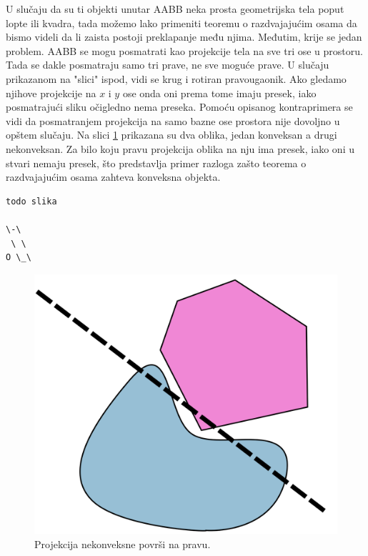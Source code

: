 \documentclass[12pt,oneside]{memoir}
\begin{document}
U slučaju da su ti objekti unutar AABB neka prosta geometrijska tela poput
lopte ili kvadra, tada možemo lako primeniti teoremu o razdvajajućim osama da bismo videli da li zaista 
postoji preklapanje među njima. Međutim, krije se jedan problem.
AABB se mogu posmatrati kao projekcije tela na sve tri ose u prostoru.
Tada se dakle posmatraju samo tri prave, ne sve moguće prave. 
U slučaju prikazanom na "slici" ispod, vidi se krug i rotiran pravougaonik. Ako gledamo njihove projekcije 
na $x$ i $y$ ose onda oni prema tome imaju presek, iako posmatrajući sliku očigledno nema preseka.
Pomoću opisanog kontraprimera se vidi da posmatranjem projekcija na samo bazne ose prostora nije dovoljno
u opštem slučaju. Na slici \ref{fig:counter} prikazana su dva oblika, jedan konveksan a drugi nekonveksan. 
Za bilo koju pravu projekcija oblika na nju ima presek, iako oni u stvari nemaju presek, što predstavlja 
primer razloga zašto teorema o razdvajajućim osama zahteva konveksna objekta.

\begin{verbatim}
todo slika

\-\
 \ \
O \_\
\end{verbatim}


\begin{figure}[h!]
	\begin{center}
	\includegraphics[scale=0.2]{theorem_counterexample.png}
	\end{center}
	\caption{Projekcija nekonveksne površi na pravu.}
	\label{fig:counter}
\end{figure}
\end{document}
